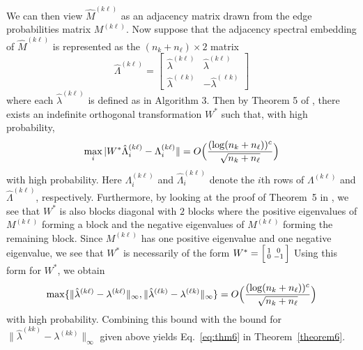 \documentclass[12pt]{article}
\begin{document}
We can then view \(\hat{M}^{(k \ell)}\) as an adjacency matrix drawn from
the edge probabilities matrix \(M^{(k \ell)}\). Now suppose that the adjacency spectral
embedding of $\hat{M}^{(k \ell)}$ is represented as the $(n_k +
n_{\ell}) \times 2$ matrix
\[\hat{\Lambda}^{(k \ell)} = \begin{bmatrix} 
  \hat{\lambda}^{(k \ell)} & \hat{\lambda}^{(k \ell)} \\ 
  \hat{\lambda}^{(\ell k)} & -\hat{\lambda}^{(\ell k)} 
\end{bmatrix}\]
where each \(\hat{\lambda}^{(k \ell)}\) is defined as in Algorithm 3. Then
by Theorem 5 of \citet{rubindelanchy2017statistical}, there
exists an indefinite orthogonal transformation $W^{*}$ such that,  with
high probability,
$$\max_{i} |W^{*} \hat{\Lambda}_{i}^{(k \ell)} - \Lambda_{i}^{(k \ell)} \| =
O\Bigl(\frac{(\log (n_k + n_{\ell}))^c}{\sqrt{n_k + n_{\ell}}}\Bigr)$$
with high probability. Here $\Lambda_{i}^{(k \ell)}$ and
$\hat{\Lambda}_i^{(k \ell)}$ denote the $i$th rows of $\Lambda^{(k
  \ell)}$ and $\hat{\Lambda}^{(k \ell)}$, respectively. 
Furthermore, by looking at the proof of Theorem~5 in
\cite{rubindelanchy2017statistical}, we see that $W^{*}$ is also
blocks diagonal with $2$ blocks where the positive eigenvalues of $M^{(k \ell)}$
forming a block and the negative eigenvalues of $M^{(k \ell)}$ forming
the remaining block. %
Since $M^{(k \ell)}$ has one positive eigenvalue and one negative
eigenvalue, we see that $W^{*}$ is necessarily of the form $W^{*}
= \Bigl[\begin{smallmatrix} 1 & 0 \\ 0 & - 1\end{smallmatrix}\Bigr]$
Using this form for $W^{*}$, we obtain
$$\max\{\|\hat{\lambda}^{(k \ell)} - \lambda^{(k \ell)}\|_{\infty},
\|\hat{\lambda}^{(\ell k)} - \lambda^{(\ell k)}\|_{\infty}\}  =
O\Bigl(\frac{(\log (n_k + n_{\ell}))^c}{\sqrt{n_k + n_{\ell}}}\Bigr)$$
with high probability. Combining this bound with the bound for
$\|\hat{\lambda}^{(kk)} - \lambda^{(kk)}\|_{\infty}$ given above
yields Eq.~\eqref{eq:thm6} in Theorem~\ref{theorem6}. 
\end{document}
